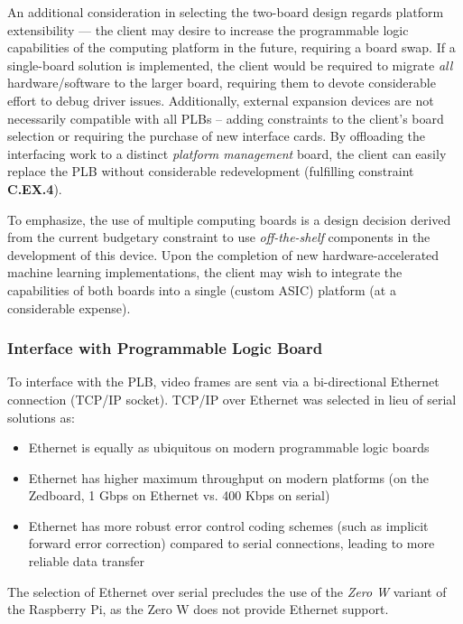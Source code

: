 An additional consideration in selecting the two-board design regards platform extensibility --- the client may desire to increase the programmable logic capabilities of the computing platform in the future, requiring a board swap. If a single-board solution is implemented, the client would be required to migrate \textit{all} hardware/software to the larger board, requiring them to devote considerable effort to debug driver issues. Additionally, external expansion devices are not necessarily compatible with all PLBs -- adding constraints to the client's board selection or requiring the purchase of new interface cards. By offloading the interfacing work to a distinct \textit{platform management} board, the client can easily replace the PLB without considerable redevelopment (fulfilling constraint \textbf{C.EX.4}). 

To emphasize, the use of multiple computing boards is a design decision derived from the current budgetary constraint to use \textit{off-the-shelf} components in the development of this device. Upon the completion of new hardware-accelerated machine learning implementations, the client may wish to integrate the capabilities of both boards into a single (custom ASIC) platform (at a considerable expense). 

\subsubsection{Interface with Programmable Logic Board}

To interface with the PLB, video frames are sent via a bi-directional Ethernet connection (TCP/IP socket). TCP/IP over Ethernet was selected in lieu of serial solutions as:
\begin{itemize}
\item Ethernet is equally as ubiquitous on modern programmable logic boards
\item Ethernet has higher maximum throughput on modern platforms (on the Zedboard, 1 Gbps on Ethernet vs. 400 Kbps on serial)
\item Ethernet has more robust error control coding schemes (such as implicit forward error correction\cite{mclaughlin_warland}) compared to serial connections, leading to more reliable data transfer
\end{itemize} 

The selection of Ethernet over serial precludes the use of the \textit{Zero W} variant of the Raspberry Pi, as the Zero W does not provide Ethernet support. 

